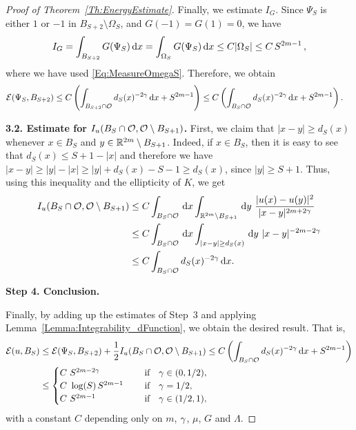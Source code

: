 \begin{proof}[Proof of Theorem~\ref{Th:EnergyEstimate}]
Finally, we estimate $I_G$. Since $\Psi_S$ is either $1$ or $-1$ in $B_{S+2}\setminus \Omega_S$, and $G(-1)=G(1)=0$, we have
\begin{align*}
I_G = \int_{B_{S+2}} G(\Psi_S) \,\mathrm{d} x= \int_{\Omega_S} G(\Psi_S)\,\mathrm{d} x \leq C | \Omega_S| \leq C\,S^{2m-1}\,,
\end{align*}
where we have used \eqref{Eq:MeasureOmegaS}. Therefore, we obtain
\begin{align*}
\mathcal{E}(\Psi_S,B_{S+2}) &\leq C \left(\int_{B_{S+2} \cap \mathcal{O}} d_S(x)^{-2\gamma} \,\mathrm{d} x + S^{2m-1} \right)\leq C\left(\int_{B_{S} \cap \mathcal{O}} d_S(x)^{-2\gamma} \,\mathrm{d} x + S^{2m-1} \right).
\end{align*}


\textbf{3.2. Estimate for $I_u(B_S \cap \mathcal{O}, \mathcal{O} \setminus B_{S+1})$.} First, we claim that $|x-y|\geq d_S(x)$ whenever $x\in B_S$ and $y\in \mathbb{R}^{2m}\setminus B_{S+1}$. Indeed, if $x\in B_S$, then it is easy to see that $d_S(x) \leq S+1-|x|$ and therefore we have $|x-y|\geq |y|-|x|\geq |y|+d_S(x)-S-1 \geq  d_S(x)$, since $|y| \geq S+1$. Thus, using this inequality and the ellipticity of $K$, we get
\begin{align*}
I_u(B_S \cap \ocal, \ocal \setminus B_{S+1}) &\leq C \int_{B_S \cap \ocal} \d x \int_{\R^{2m}\setminus B_{S+1}} \d y \ \frac{|u(x)-u(y)|^2}{|x-y|^{2m+2\s}} \\
& \leq C \int_{B_S \cap \ocal} \d x \int_{|x-y|\geq d_S(x)} \d y \ |x-y|^{-2m-2\s} \\
&\leq C \int_{B_S \cap \ocal} d_S(x)^{-2\s} \d x.
\end{align*}

\textbf{Step 4. Conclusion.}

Finally, by adding up the estimates of Step~3 and applying Lemma~\ref{Lemma:Integrability_dFunction}, we obtain the desired result. That is,
\begin{align*}
\mathcal{E}(u,B_S) &\leq \mathcal{E}(\Psi_S,B_{S+2}) +  \frac{1}{2}I_u(B_S \cap \mathcal{O}, \mathcal{O} \setminus B_{S+1}) \leq C\left(\int_{B_S \cap \mathcal{O}} d_S(x)^{-2\gamma} \,\mathrm{d} x + S^{2m-1} \right)\\
&\leq \begin{cases}
C \ S^{2m-2\gamma}\ \ \ &\textrm{if } \ \ \gamma\in(0,1/2),\\
C\ \log(S)\,S^{2m-1}\ \ \ \ &\textrm{if } \ \ \gamma=1/2,\\
C \ S^{2m-1}\ \ \ \ &\textrm{if } \ \ \gamma\in(1/2,1),\\
\end{cases}
\end{align*}
with a constant $C$ depending only on $m$, $\gamma$, $\mu$, $G$ and $\Lambda$. 


\end{proof}
